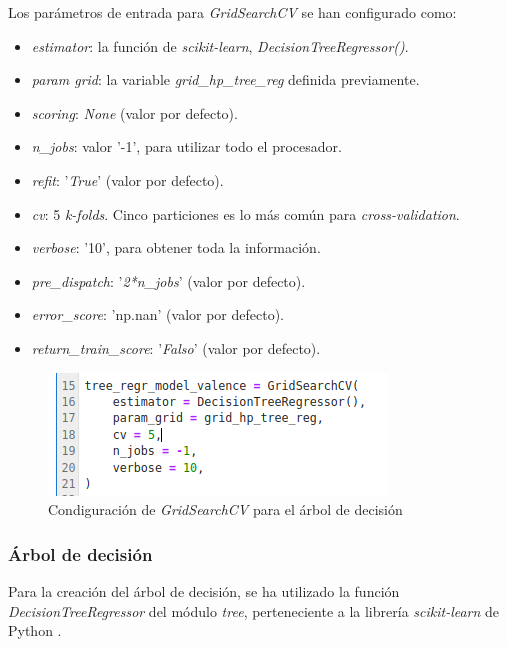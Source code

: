 \documentclass[12pt,a4paper,Spanish]{article}
\begin{document}
Los parámetros de entrada para \textit{GridSearchCV} se han configurado como:
\begin{itemize}
	\item \textit{estimator}: la función de \textit{scikit-learn}, \textit{DecisionTreeRegressor()}.
	\item \textit{param grid}: la variable \textit{grid\_hp\_tree\_reg} definida previamente.
	\item \textit{scoring}: \textit{None} (valor por defecto).
	\item \textit{n\_jobs}: valor '-1', para utilizar todo el procesador.
	\item \textit{refit}: '\textit{True}' (valor por defecto).
	\item \textit{cv}: 5 \textit{k-folds}. Cinco particiones es lo más común para \textit{cross-validation}.
	\item \textit{verbose}: '10', para obtener toda la información.
	\item \textit{pre\_dispatch}: '\textit{2*n\_jobs}' (valor por defecto).
	\item \textit{error\_score}: 'np.nan' (valor por defecto).
	\item \textit{return\_train\_score}: '\textit{Falso}' (valor por defecto).
\end{itemize}
\begin{figure}[H]
	\centering
	\includegraphics[width=0.7\linewidth]{figs/cv_tree}
	\caption{Condiguración de \textit{GridSearchCV} para el árbol de decisión}
	\label{fig:cvtree}
\end{figure}



\subsubsection{Árbol de decisión}
Para la creación del árbol de decisión, se ha utilizado la función \textit{DecisionTreeRegressor} del módulo \textit{tree}, perteneciente a la librería \textit{scikit-learn} de Python \cite{scikit-learn}.
\newline
\end{document}
